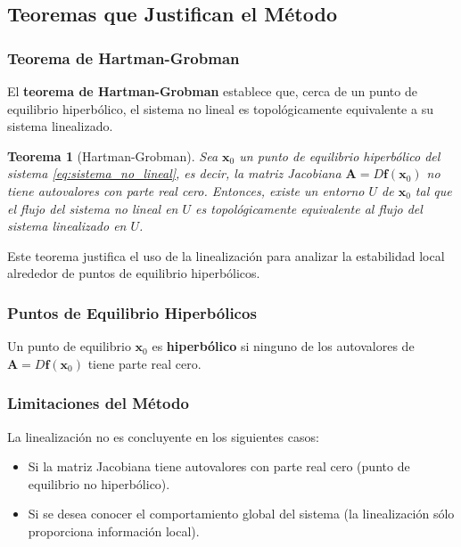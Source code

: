 \documentclass[12pt, a4paper]{report}
\newtheorem{theorem}{Teorema}
\begin{document}
\subsection{Teoremas que Justifican el Método}

\subsubsection{Teorema de Hartman-Grobman}

El \textbf{teorema de Hartman-Grobman} establece que, cerca de un punto de equilibrio hiperbólico, el sistema no lineal es topológicamente equivalente a su sistema linealizado.

\begin{theorem}[Hartman-Grobman]
Sea \(\mathbf{x}_0\) un punto de equilibrio hiperbólico del sistema \eqref{eq:sistema_no_lineal}, es decir, la matriz Jacobiana \( \mathbf{A} = D\mathbf{f}(\mathbf{x}_0) \) no tiene autovalores con parte real cero. Entonces, existe un entorno \( U \) de \(\mathbf{x}_0\) tal que el flujo del sistema no lineal en \( U \) es topológicamente equivalente al flujo del sistema linealizado en \( U \).
\end{theorem}

Este teorema justifica el uso de la linealización para analizar la estabilidad local alrededor de puntos de equilibrio hiperbólicos.

\subsubsection{Puntos de Equilibrio Hiperbólicos}

Un punto de equilibrio \(\mathbf{x}_0\) es \textbf{hiperbólico} si ninguno de los autovalores de \( \mathbf{A} = D\mathbf{f}(\mathbf{x}_0) \) tiene parte real cero.

\subsubsection{Limitaciones del Método}

La linealización no es concluyente en los siguientes casos:

\begin{itemize}
    \item Si la matriz Jacobiana tiene autovalores con parte real cero (punto de equilibrio no hiperbólico).
    \item Si se desea conocer el comportamiento global del sistema (la linealización sólo proporciona información local).
\end{itemize}
\end{document}
